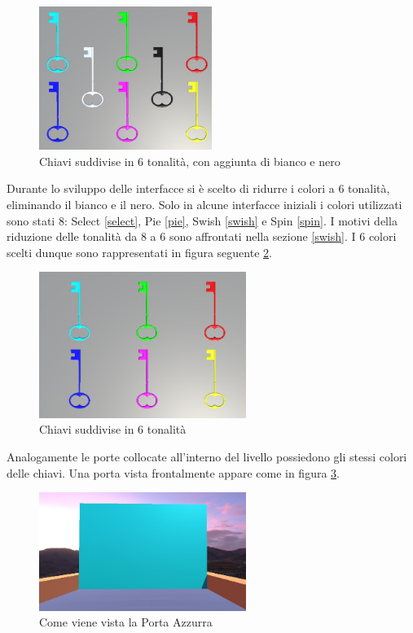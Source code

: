 \documentclass[target=bach,aauheader=]{thud}
\begin{document}
\begin{figure}[h]
    \centering
    \includegraphics[width=0.50\textwidth]{keys2}
    \caption{Chiavi suddivise in 6 tonalità, con aggiunta di bianco e nero}
    \label{fig:keys2}
\end{figure}
Durante lo sviluppo delle interfacce si è scelto di ridurre i colori a 6 tonalità, eliminando il bianco e il nero.
Solo in alcune interfacce iniziali i colori utilizzati sono stati 8: Select \ref{select}, Pie \ref{pie}, Swish \ref{swish} e Spin \ref{spin}. %
I motivi della riduzione delle tonalità da 8 a 6 sono affrontati nella sezione \ref{swish}. %
I 6 colori scelti dunque sono rappresentati in figura seguente \ref{fig:keys}.

\begin{figure}[h]
    \centering
    \includegraphics[width=0.60\textwidth]{keys}
    \caption{Chiavi suddivise in 6 tonalità}
    \label{fig:keys}
\end{figure}

Analogamente le porte collocate all'interno del livello possiedono gli stessi colori delle chiavi.
Una porta vista frontalmente appare come in figura \ref{fig:door}.

\begin{figure}[h]
    \centering
    \includegraphics[width=0.60\textwidth]{door}
    \caption{Come viene vista la Porta Azzurra}
    \label{fig:door}
\end{figure}
\end{document}
